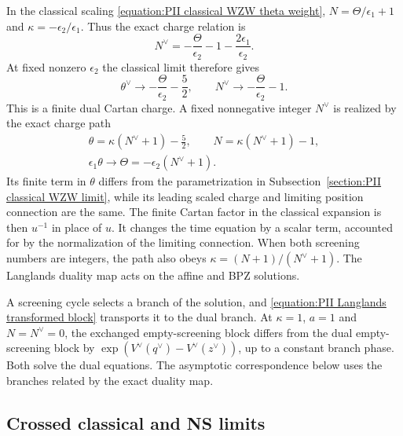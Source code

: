\documentclass[a4paper,11pt]{article}
\numberwithin{equation}{section}
\begin{document}
In the classical scaling
\eqref{equation:PII classical WZW theta weight},
$N=\Theta/\epsilon_{1}+1$ and
$\kappa=-\epsilon_{2}/\epsilon_{1}$.  Thus the exact charge relation is
\begin{equation}
	\label{equation:PII Langlands large small screening}
	N^{\vee}
	=-\frac{\Theta}{\epsilon_{2}}-1
	-\frac{2\epsilon_{1}}{\epsilon_{2}}.
\end{equation}
At fixed nonzero $\epsilon_{2}$ the classical limit therefore gives
\begin{equation}
	\theta^{\vee}\longrightarrow
	-\frac{\Theta}{\epsilon_{2}}-\frac{5}{2},
	\qquad
	N^{\vee}\longrightarrow-\frac{\Theta}{\epsilon_{2}}-1.
\end{equation}
This is a finite dual Cartan charge.  A fixed nonnegative integer
$N^{\vee}$ is realized by the exact charge path
\begin{equation}
	\begin{gathered}
		\theta=\kappa(N^{\vee}+1)-\frac{5}{2},
		\qquad N=\kappa(N^{\vee}+1)-1,\\
		\epsilon_{1}\theta\longrightarrow
		\Theta=-\epsilon_{2}(N^{\vee}+1).
	\end{gathered}
\end{equation}
Its finite term in $\theta$ differs from the parametrization in
Subsection~\ref{section:PII classical WZW limit}, while its leading
scaled charge and limiting position connection are the same.
The finite Cartan factor in the classical expansion is then $u^{-1}$
in place of $u$.  It changes the time equation by a scalar term, accounted for by
the normalization of the limiting connection.
When both screening numbers are integers, the path also obeys
$\kappa=(N+1)/(N^{\vee}+1)$.  The Langlands duality map acts on the affine
and BPZ solutions.

A screening cycle selects a branch of the solution, and
\eqref{equation:PII Langlands transformed block} transports it to the
dual branch.  At $\kappa=1$, $a=1$ and $N=N^{\vee}=0$, the exchanged
empty-screening block differs from the dual empty-screening block by
$\exp\left(V^{\vee}(q^{\vee})-V^{\vee}(z^{\vee})\right)$,
up to a constant branch phase.  Both solve the dual equations.
The asymptotic correspondence below uses the branches related
by the exact duality map.

\subsection{Crossed classical and NS limits}
\label{subsection:PII Langlands exchanged limits}
\end{document}
